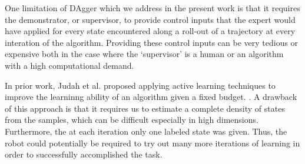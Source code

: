 \documentclass[10pt, conference]{ieeeconf}      %
\begin{document}
One limitation of DAgger which we address in the present work is that it requires the demonstrator, or supervisor, to
provide control inputs that the expert would have applied for every state encountered along a roll-out of a trajectory at every interation of the
algorithm. Providing these control inputs can be very tedious or expensive both in the case where the `supervisor' is a
human or an algorithm with a high computational demand.

In prior work, Judah et al. proposed applying active learning techniques to improve the learninng ability of an algorithm given a fixed budget. 
\cite{judah2011active,judah2012active}. A drawback of this approach is that it requires us to estimate a complete
density of states from the samples, which can be difficult especially in high dimensions. Furthermore, the  
at each iteration only one labeled state was given. Thus, the robot could potentially be required to try out many more iterations of learning in order to successfully accomplished the task.  
\end{document}
